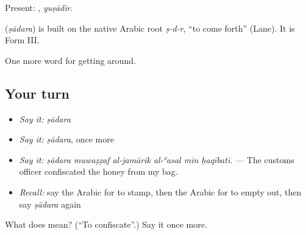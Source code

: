 Present: , \emph{yuṣādir}.

\begin{cousinweb}
\textbf{} (\emph{ṣādara}) is built on the native Arabic root \emph{ṣ-d-r}, \textquotedblleft{}to come forth\textquotedblright{} (Lane). It is Form III.
\end{cousinweb}

\begin{grammarlens}[title={What you've built}]
One more word for getting around.
\end{grammarlens}

\subsection*{Your turn}
\begin{itemize}
\raggedright
  \item \emph{Say it:} \emph{ṣādara}
  \item \emph{Say it:} \emph{ṣādara}, once more
  \item \emph{Say it:} \emph{ṣādara muwaẓẓaf al-jamārik al-ʿasal min ḥaqībatī.} — The customs officer confiscated the honey from my bag.
  \item \emph{Recall:} say the Arabic for to stamp, then the Arabic for to empty out, then say \emph{ṣādara} again
\end{itemize}

\begin{tcolorbox}[breakable,colback=teal!4,colframe=teal!35!black,title={Before you move on}]
What does  mean? (\textquotedblleft{}To confiscate\textquotedblright{}.) Say it once more.
\end{tcolorbox}
